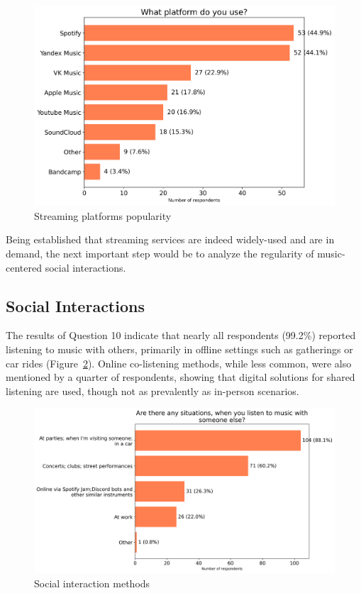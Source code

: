 \begin{figure}[htbp]
    \centering
    \includegraphics[height=0.4\textheight]{charts/streaming platform.png}
    \caption{Streaming platforms popularity}
    \label{fig:platform_popularity}
\end{figure}

Being established that streaming services are indeed widely-used and are in demand, the next important step would be
to analyze the regularity of music-centered social interactions.

\subsection{Social Interactions}
The results of Question 10 indicate that nearly all respondents (99.2\%) reported listening to music with
others, primarily in offline settings such as gatherings or car rides (Figure~\ref{fig:listentogethermeth}).
Online co-listening methods, while less common, were also mentioned by a quarter of respondents,
showing that digital solutions for shared listening are used, though not as prevalently as in-person scenarios.

\begin{figure}[htbp]
    \centering
    \includegraphics[height=0.4\textheight]{charts/listen together method.png}
    \caption{Social interaction methods}
    \label{fig:listentogethermeth}
\end{figure}

